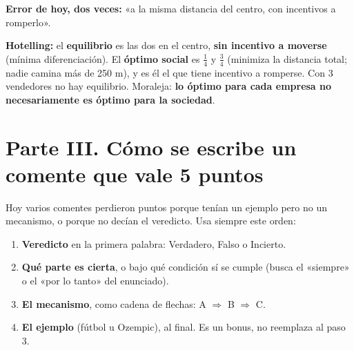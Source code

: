 \documentclass[11pt]{article}
\begin{document}
\begin{error}
\textbf{Error de hoy, dos veces:} «a la misma distancia del centro, con incentivos a romperlo».
\end{error}
\begin{clave}
\textbf{Hotelling:} el \textbf{equilibrio} es las dos en el centro, \textbf{sin incentivo a moverse} (mínima diferenciación). El \textbf{óptimo social} es $\tfrac14$ y $\tfrac34$ (minimiza la distancia total; nadie camina más de 250 m), y es él el que tiene incentivo a romperse. Con 3 vendedores no hay equilibrio. Moraleja: \textbf{lo óptimo para cada empresa no necesariamente es óptimo para la sociedad}.
\end{clave}

\section*{Parte III. Cómo se escribe un comente que vale 5 puntos}

Hoy varios comentes perdieron puntos porque tenían un ejemplo pero no un mecanismo, o porque no decían el veredicto. Usa siempre este orden:
\begin{enumerate}[leftmargin=*,itemsep=2pt]
\item \textbf{Veredicto} en la primera palabra: Verdadero, Falso o Incierto.
\item \textbf{Qué parte es cierta}, o bajo qué condición sí se cumple (busca el «siempre» o el «por lo tanto» del enunciado).
\item \textbf{El mecanismo}, como cadena de flechas: A $\Rightarrow$ B $\Rightarrow$ C.
\item \textbf{El ejemplo} (fútbol u Ozempic), al final. Es un bonus, no reemplaza al paso 3.
\end{enumerate}
\end{document}
